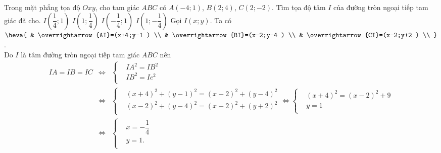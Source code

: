 \begin{ex}%
	Trong mặt phẳng tọa độ $Oxy$, cho tam giác $ABC$ có $A(-4;1 )$, $B(2;4 )$, $C(2;-2 )$. Tìm tọa độ tâm $I$ của đường tròn ngoại tiếp tam giác đã cho.
	\choice
	{$I\left(\dfrac{1}{4};1 \right)$}
	{$I\left(1;\dfrac{1}{4} \right)$}
	{\True $I\left(-\dfrac{1}{4};1 \right)$}
	{$I\left(1;-\dfrac{1}{4} \right)$}
	\loigiai
	{Gọi $I(x;y )$. Ta có $\heva{
			& \overrightarrow{AI}=(x+4;y-1 ) \\
			& \overrightarrow{BI}=(x-2;y-4 ) \\
			& \overrightarrow{CI}=(x-2;y+2 ) \\
		}$. \\
		Do $I$ là tâm đường tròn ngoại tiếp tam giác $ABC$ nên \begin{eqnarray*}
			IA=IB=IC&\Leftrightarrow& \left\{ \begin{aligned}
				&IA^2=IB^2 \\
				&IB^2=Ic^2 \\
			\end{aligned} \right.\\
			&\Leftrightarrow& \left\{ \begin{aligned}
				&{{(x+4 )}^2}+{{(y-1 )}^2}={{(x-2 )}^2}+{{(y-4 )}^2} \\
				&{{(x-2 )}^2}+{{(y-4 )}^2}={{(x-2 )}^2}+{{(y+2 )}^2} \\
			\end{aligned} \right.\Leftrightarrow \left\{ \begin{aligned}
				&{{(x+4 )}^2}={{(x-2 )}^2}+9 \\
				&y=1 \\
			\end{aligned} \right.\\
			&\Leftrightarrow& \left\{ \begin{aligned}
				&x=-\dfrac{1}{4} \\
				&y=1. \\
			\end{aligned} \right.
	\end{eqnarray*}}
\end{ex}

